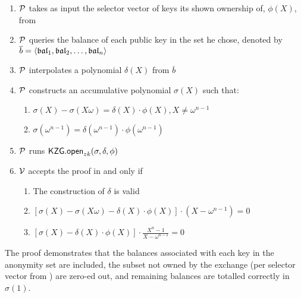 

\begin{Protocol*}[t!]
\begin{framed}
\footnotesize


\begin{enumerate}
	\item $\mathcal{P}$ takes as input the selector vector of keys its shown ownership of, $\phi(X)$, from \bootstrap 
	\item $\mathcal{P}$ queries the balance of each public key in the set he chose, denoted by $\overline{b}=\left \langle \mathfrak{bal}_1,\mathfrak{bal}_2,\dots,\mathfrak{bal}_n \right \rangle$
	\item $\mathcal{P}$ interpolates a polynomial $\delta(X)$ from $\overline{b}$
	\item $\mathcal{P}$ constructs an accumulative polynomial $\sigma(X)$ such that:
		\begin{enumerate}
	\item $\sigma(X)-\sigma(X\omega)=\delta(X)\cdot\phi(X),X\ne{\omega^{n-1}}$
	\item $\sigma(\omega^{n-1})=\delta(\omega^{n-1})\cdot\phi(\omega^{n-1})$
		\end{enumerate}
	\item $\mathcal{P}$ runs $\mathsf{KZG.open}_{zk}(\sigma,\delta,\phi)$
	\item $\mathcal{V}$ accepts the proof in and only if
	\begin{enumerate}
		\item The construction of $\delta$ is valid
		\item $[\sigma(X)-\sigma(X\omega)-\delta(X)\cdot{\phi(X)}]\cdot(X-\omega^{n-1})=0$
		\item $[\sigma(X)-\delta(X)\cdot{\phi(X)}]\cdot\frac{X^n-1}{X-\omega^{n-1}}=0$
	\end{enumerate}
\end{enumerate}	


\normalsize	
\end{framed}
\caption{The \poa proof demonstrates that the balances associated with each key in the anonymity set are included, the subset not owned by the exchange (per selector vector from \bootstrap) are zero-ed out, and remaining balances are totalled correctly in $\sigma(1)$. \label{alg:poa}}
\end{Protocol*}

